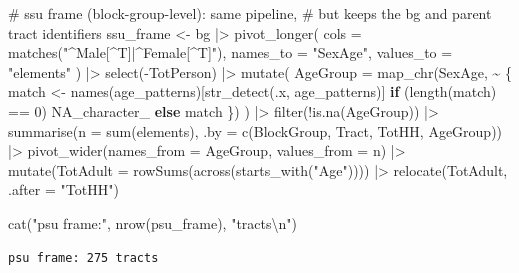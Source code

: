 \documentclass[
  11pt,
]{article}
\newenvironment{Shaded}{\begin{snugshade}}{\end{snugshade}}
\newcommand{\AttributeTok}[1]{\textcolor[rgb]{0.40,0.45,0.13}{#1}}
\newcommand{\CommentTok}[1]{\textcolor[rgb]{0.37,0.37,0.37}{#1}}
\newcommand{\ConstantTok}[1]{\textcolor[rgb]{0.56,0.35,0.01}{#1}}
\newcommand{\ControlFlowTok}[1]{\textcolor[rgb]{0.00,0.23,0.31}{\textbf{#1}}}
\newcommand{\DecValTok}[1]{\textcolor[rgb]{0.68,0.00,0.00}{#1}}
\newcommand{\FunctionTok}[1]{\textcolor[rgb]{0.28,0.35,0.67}{#1}}
\newcommand{\NormalTok}[1]{\textcolor[rgb]{0.00,0.23,0.31}{#1}}
\newcommand{\OtherTok}[1]{\textcolor[rgb]{0.00,0.23,0.31}{#1}}
\newcommand{\SpecialCharTok}[1]{\textcolor[rgb]{0.37,0.37,0.37}{#1}}
\newcommand{\StringTok}[1]{\textcolor[rgb]{0.13,0.47,0.30}{#1}}
\begin{document}
\begin{Shaded}
\begin{Highlighting}[]
\CommentTok{\# ssu frame (block{-}group{-}level): same pipeline,}
\CommentTok{\# but keeps the bg and parent tract identifiers}
\NormalTok{ssu\_frame }\OtherTok{\textless{}{-}}\NormalTok{ bg }\SpecialCharTok{|\textgreater{}}
  \FunctionTok{pivot\_longer}\NormalTok{(}
    \AttributeTok{cols =} \FunctionTok{matches}\NormalTok{(}\StringTok{"\^{}Male[\^{}T]|\^{}Female[\^{}T]"}\NormalTok{),}
    \AttributeTok{names\_to =} \StringTok{"SexAge"}\NormalTok{, }\AttributeTok{values\_to =} \StringTok{"elements"}
\NormalTok{  ) }\SpecialCharTok{|\textgreater{}}
  \FunctionTok{select}\NormalTok{(}\SpecialCharTok{{-}}\NormalTok{TotPerson) }\SpecialCharTok{|\textgreater{}}
  \FunctionTok{mutate}\NormalTok{(}
    \AttributeTok{AgeGroup =} \FunctionTok{map\_chr}\NormalTok{(SexAge, }\SpecialCharTok{\textasciitilde{}}\NormalTok{ \{}
\NormalTok{      match }\OtherTok{\textless{}{-}} \FunctionTok{names}\NormalTok{(age\_patterns)[}\FunctionTok{str\_detect}\NormalTok{(.x, age\_patterns)]}
      \ControlFlowTok{if}\NormalTok{ (}\FunctionTok{length}\NormalTok{(match) }\SpecialCharTok{==} \DecValTok{0}\NormalTok{) }\ConstantTok{NA\_character\_} \ControlFlowTok{else}\NormalTok{ match}
\NormalTok{    \})}
\NormalTok{  ) }\SpecialCharTok{|\textgreater{}}
  \FunctionTok{filter}\NormalTok{(}\SpecialCharTok{!}\FunctionTok{is.na}\NormalTok{(AgeGroup)) }\SpecialCharTok{|\textgreater{}}
  \FunctionTok{summarise}\NormalTok{(}\AttributeTok{n =} \FunctionTok{sum}\NormalTok{(elements), }\AttributeTok{.by =} \FunctionTok{c}\NormalTok{(BlockGroup, Tract, TotHH, AgeGroup)) }\SpecialCharTok{|\textgreater{}}
  \FunctionTok{pivot\_wider}\NormalTok{(}\AttributeTok{names\_from =}\NormalTok{ AgeGroup, }\AttributeTok{values\_from =}\NormalTok{ n) }\SpecialCharTok{|\textgreater{}}
  \FunctionTok{mutate}\NormalTok{(}\AttributeTok{TotAdult =} \FunctionTok{rowSums}\NormalTok{(}\FunctionTok{across}\NormalTok{(}\FunctionTok{starts\_with}\NormalTok{(}\StringTok{"Age"}\NormalTok{)))) }\SpecialCharTok{|\textgreater{}}
  \FunctionTok{relocate}\NormalTok{(TotAdult, }\AttributeTok{.after =} \StringTok{"TotHH"}\NormalTok{)}

\FunctionTok{cat}\NormalTok{(}\StringTok{"psu frame:"}\NormalTok{, }\FunctionTok{nrow}\NormalTok{(psu\_frame), }\StringTok{"tracts}\SpecialCharTok{\textbackslash{}n}\StringTok{"}\NormalTok{)}
\end{Highlighting}
\end{Shaded}

\begin{verbatim}
psu frame: 275 tracts
\end{verbatim}
\end{document}
